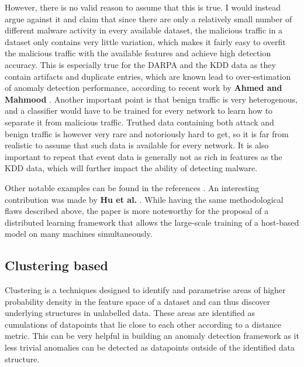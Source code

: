 \documentclass[a4paper,12pt,twoside]{report}
\begin{document}
However, there is no valid reason to assume that this is true. I would instead argue against it and claim that since there are only a relatively small number of different malware activity in every available dataset, the malicious traffic in a dataset only contains very little variation, which makes it fairly easy to overfit the malicious traffic with the available features and achieve high detection accuracy. %
This is especially true for the DARPA and the KDD data as they contain artifacts and  duplicate entries, which are known lead to over-estimation of anomaly detection performance, according to recent work by \textbf{Ahmed and Mahmood} \cite{ahmed2016survey}. Another important point is that benign traffic is very heterogenous, and a classifier would have to be trained for every network to learn how to separate it from malicious traffic. Truthed data containing both attack and benign traffic is however very rare and notoriously hard to get, so it is far from realistic to assume that such data is available for every network. It is also important to repeat that event data is generally not as rich in features as the KDD data, which will further impact the ability of detecting malware. 


Other notable examples can be found in the references \cite{gupta_layered_2010,muda_intrusion_2011,maglaras_intrusion_2014,
peddabachigari_intrusion_nodate,ramos_antids_2005}.
An interesting contribution was made by \textbf{Hu et al.} \cite{hu2014online}. While having the same methodological flaws described above, the paper is more noteworthy for the proposal of a distributed learning framework that allows the large-scale training of a host-based model on many machines simultaneously.

\subsection{Clustering based}

Clustering is a techniques designed to identify and parametrise areas of higher probability density in the feature space of a dataset and can thus discover underlying structures in unlabelled data. These areas are identified as cumulations of datapoints that lie close to each other according to a distance metric. This can be very helpful in building an anomaly detection framework as it less trivial anomalies can be detected as datapoints outside of the identified data structure. 
\end{document}
